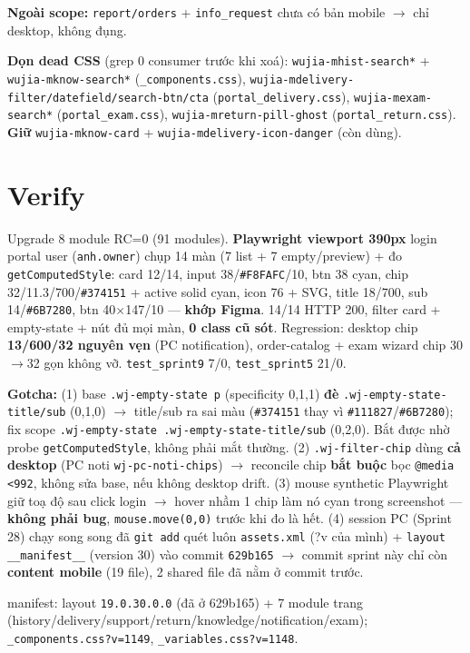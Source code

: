 \textbf{Ngoài scope:} \texttt{report/orders} + \texttt{info\_request} chưa có bản mobile $\rightarrow$ chỉ desktop, không đụng.

\textbf{Dọn dead CSS} (grep 0 consumer trước khi xoá): \texttt{wujia-mhist-search*} + \texttt{wujia-mknow-search*} (\texttt{\_components.css}), \texttt{wujia-mdelivery-filter/datefield/search-btn/cta} (\texttt{portal\_delivery.css}), \texttt{wujia-mexam-search*} (\texttt{portal\_exam.css}), \texttt{wujia-mreturn-pill-ghost} (\texttt{portal\_return.css}). \textbf{Giữ} \texttt{wujia-mknow-card} + \texttt{wujia-mdelivery-icon-danger} (còn dùng).

\section{Verify}

Upgrade 8 module RC=0 (91 modules). \textbf{Playwright viewport 390px} login portal user (\texttt{anh.owner}) chụp 14 màn (7 list + 7 empty/preview) + đo \texttt{getComputedStyle}: card 12/14, input 38/\texttt{\#F8FAFC}/10, btn 38 cyan, chip 32/11.3/700/\texttt{\#374151} + active solid cyan, icon 76 + SVG, title 18/700, sub 14/\texttt{\#6B7280}, btn 40$\times$147/10 --- \textbf{khớp Figma}. 14/14 HTTP 200, filter card + empty-state + nút đủ mọi màn, \textbf{0 class cũ sót}. Regression: desktop chip \textbf{13/600/32 nguyên vẹn} (PC notification), order-catalog + exam wizard chip 30$\rightarrow$32 gọn không vỡ. \texttt{test\_sprint9} 7/0, \texttt{test\_sprint5} 21/0.

\textbf{Gotcha:} (1) base \texttt{.wj-empty-state p} (specificity 0,1,1) \textbf{đè} \texttt{.wj-empty-state-title/sub} (0,1,0) $\rightarrow$ title/sub ra sai màu (\texttt{\#374151} thay vì \texttt{\#111827}/\texttt{\#6B7280}); fix scope \texttt{.wj-empty-state .wj-empty-state-title/sub} (0,2,0). Bắt được nhờ probe \texttt{getComputedStyle}, không phải mắt thường. (2) \texttt{.wj-filter-chip} dùng \textbf{cả desktop} (PC noti \texttt{wj-pc-noti-chips}) $\rightarrow$ reconcile chip \textbf{bắt buộc} bọc \texttt{@media <992}, không sửa base, nếu không desktop drift. (3) mouse synthetic Playwright giữ toạ độ sau click login $\rightarrow$ hover nhầm 1 chip làm nó cyan trong screenshot --- \textbf{không phải bug}, \texttt{mouse.move(0,0)} trước khi đo là hết. (4) session PC (Sprint 28) chạy song song đã \texttt{git add} quét luôn \texttt{assets.xml} (?v của mình) + \texttt{layout \_\_manifest\_\_} (version 30) vào commit \texttt{629b165} $\rightarrow$ commit sprint này chỉ còn \textbf{content mobile} (19 file), 2 shared file đã nằm ở commit trước.

manifest: layout \texttt{19.0.30.0.0} (đã ở 629b165) + 7 module trang (history/delivery/support/return/knowledge/notification/exam); \texttt{\_components.css?v=1149}, \texttt{\_variables.css?v=1148}.
